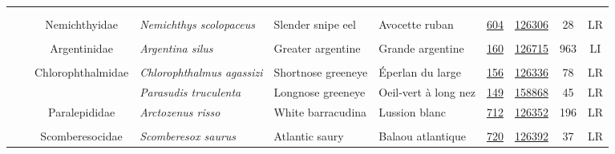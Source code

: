\documentclass[12pt]{article}\usepackage[]{graphicx}\usepackage[]{color}
\begin{document}
\begin{landscapepage}
\begin{longtable}[t]{ccc>{\centering\arraybackslash}p{3cm}>{\centering\arraybackslash}p{3cm}>{\centering\arraybackslash}p{3cm}>{}c>{}ccc}
\endfoot
\bottomrule
\endlastfoot
\addlinespace[0.3em]
\\
\addlinespace[0.3em]
\\
\hspace{1em}\hspace{1em} &  & Nemichthyidae & \em{Nemichthys scolopaceus} & Slender snipe eel & Avocette ruban & \href{#sec:241}{604} & \href{http://www.marinespecies.org/aphia.php?p=taxdetails&id=101170}{126306} & 28 & LR\\
\addlinespace[0.3em]
\\
\hspace{1em}\hspace{1em} &  & Argentinidae & \em{Argentina silus} & Greater argentine & Grande argentine & \href{#sec:240}{160} & \href{http://www.marinespecies.org/aphia.php?p=taxdetails&id=101174}{126715} & 963 & LI\\
\addlinespace[0.3em]
\\
\hspace{1em}\hspace{1em} &  & Chlorophthalmidae & \em{Chlorophthalmus agassizi} & Shortnose greeneye & Éperlan du large & \href{#sec:10}{156} & \href{http://www.marinespecies.org/aphia.php?p=taxdetails&id=126436}{126336} & 78 & LR\\
\hspace{1em}\hspace{1em} &  &  & \em{Parasudis truculenta} & Longnose greeneye & Oeil-vert à long nez & \href{#sec:11}{149} & \href{http://www.marinespecies.org/aphia.php?p=taxdetails&id=126437}{158868} & 45 & LR\\
\hspace{1em}\hspace{1em} &  & Paralepididae & \em{Arctozenus risso} & White barracudina & Lussion blanc & \href{#sec:12}{712} & \href{http://www.marinespecies.org/aphia.php?p=taxdetails&id=126504}{126352} & 196 & LR\\
\addlinespace[0.3em]
\\
\hspace{1em}\hspace{1em} &  & Scomberesocidae & \em{Scomberesox saurus} & Atlantic saury & Balaou atlantique & \href{#sec:13}{720} & \href{http://www.marinespecies.org/aphia.php?p=taxdetails&id=126503}{126392} & 37 & LR\\

\end{longtable}
\end{landscapepage}
\end{document}
